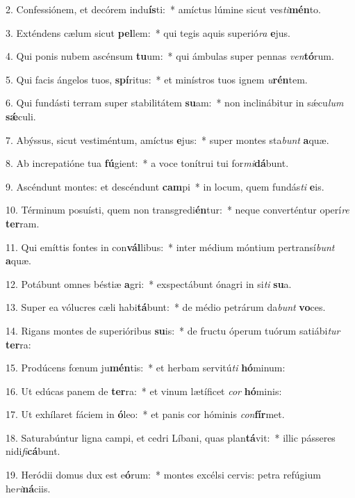 2. Confessiónem, et decórem indu\textbf{ís}ti:~*  amíctus lúmine sicut ves\textit{ti}\textbf{mén}to.\

3. Exténdens cælum sicut \textbf{pel}lem:~*  qui tegis aquis superió\textit{ra} \textbf{e}jus.\

4. Qui ponis nubem ascénsum \textbf{tu}um:~*  qui ámbulas super pennas \textit{ven}\textbf{tó}rum.\

5. Qui facis ángelos tuos, \textbf{spí}ritus:~*  et minístros tuos ignem \textit{u}\textbf{rén}tem.\

6. Qui fundásti terram super stabilitátem \textbf{su}am:~*  non inclinábitur in sǽcu\textit{lum} \textbf{sǽ}culi.\

7. Abýssus, sicut vestiméntum, amíctus \textbf{e}jus:~*  super montes sta\textit{bunt} \textbf{a}quæ.\

8. Ab increpatióne tua \textbf{fú}gient:~*  a voce tonítrui tui for\textit{mi}\textbf{dá}bunt.\

9. Ascéndunt montes: et descéndunt \textbf{cam}pi~*  in locum, quem fundás\textit{ti} \textbf{e}is.\

10. Términum posuísti, quem non transgredi\textbf{én}tur:~*  neque converténtur operí\textit{re} \textbf{ter}ram.\

11. Qui emíttis fontes in con\textbf{vál}libus:~*  inter médium móntium pertransí\textit{bunt} \textbf{a}quæ.\

12. Potábunt omnes béstiæ \textbf{a}gri:~*  exspectábunt ónagri in si\textit{ti} \textbf{su}a.\

13. Super ea vólucres cæli habi\textbf{tá}bunt:~*  de médio petrárum da\textit{bunt} \textbf{vo}ces.\

14. Rigans montes de superióribus \textbf{su}is:~*  de fructu óperum tuórum satiábi\textit{tur} \textbf{ter}ra:\

15. Prodúcens fœnum ju\textbf{mén}tis:~*  et herbam servitú\textit{ti} \textbf{hó}minum:\

16. Ut edúcas panem de \textbf{ter}ra:~*  et vinum lætíficet \textit{cor} \textbf{hó}minis:\

17. Ut exhílaret fáciem in \textbf{ó}leo:~*  et panis cor hóminis \textit{con}\textbf{fír}met.\

18. Saturabúntur ligna campi, et cedri Líbani, quas plan\textbf{tá}vit:~*  illic pásseres nidi\textit{fi}\textbf{cá}bunt.\

19. Heródii domus dux est e\textbf{ó}rum:~*  montes excélsi cervis: petra refúgium he\textit{ri}\textbf{ná}ciis.\

